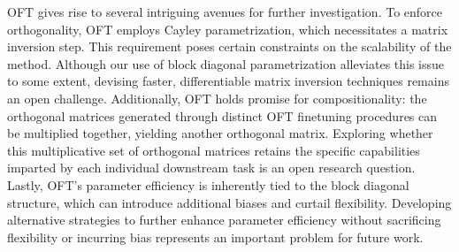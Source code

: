 OFT gives rise to several intriguing avenues for further investigation. To enforce orthogonality, OFT employs Cayley parametrization, which necessitates a matrix inversion step. This requirement poses certain constraints on the scalability of the method. Although our use of block diagonal parametrization alleviates this issue to some extent, devising faster, differentiable matrix inversion techniques remains an open challenge. Additionally, OFT holds promise for compositionality: the orthogonal matrices generated through distinct OFT finetuning procedures can be multiplied together, yielding another orthogonal matrix. Exploring whether this multiplicative set of orthogonal matrices retains the specific capabilities imparted by each individual downstream task is an open research question. Lastly, OFT's parameter efficiency is inherently tied to the block diagonal structure, which can introduce additional biases and curtail flexibility. Developing alternative strategies to further enhance parameter efficiency without sacrificing flexibility or incurring bias represents an important problem for future work.